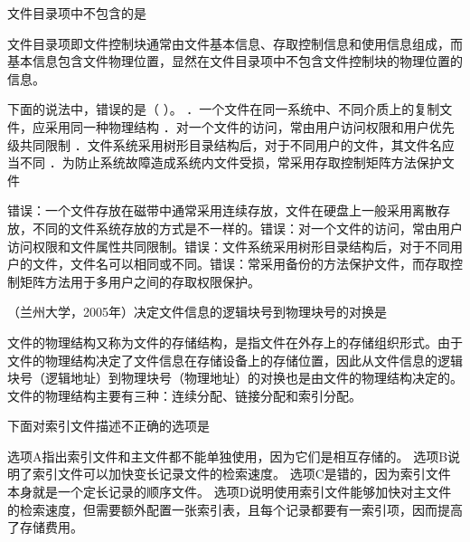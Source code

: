 \question 文件目录项中不包含的是
\par{}
\begin{solution}文件目录项即文件控制块通常由文件基本信息、存取控制信息和使用信息组成，而基本信息包含文件物理位置，显然在文件目录项中不包含文件控制块的物理位置的信息。
\end{solution}
\question 下面的说法中，错误的是（ ）。
．一个文件在同一系统中、不同介质上的复制文件，应采用同一种物理结构
．对一个文件的访问，常由用户访问权限和用户优先级共同限制
．文件系统采用树形目录结构后，对于不同用户的文件，其文件名应当不同
．为防止系统故障造成系统内文件受损，常采用存取控制矩阵方法保护文件
\par{}
\begin{solution}错误：一个文件存放在磁带中通常采用连续存放，文件在硬盘上一般采用离散存放，不同的文件系统存放的方式是不一样的。错误：对一个文件的访问，常由用户访问权限和文件属性共同限制。错误：文件系统采用树形目录结构后，对于不同用户的文件，文件名可以相同或不同。错误：常采用备份的方法保护文件，而存取控制矩阵方法用于多用户之间的存取权限保护。
\end{solution}
\question （兰州大学，2005年）决定文件信息的逻辑块号到物理块号的对换是
\par{}
\begin{solution}文件的物理结构又称为文件的存储结构，是指文件在外存上的存储组织形式。由于文件的物理结构决定了文件信息在存储设备上的存储位置，因此从文件信息的逻辑块号（逻辑地址）到物理块号（物理地址）的对换也是由文件的物理结构决定的。
文件的物理结构主要有三种：连续分配、链接分配和索引分配。
\end{solution}
\question 下面对索引文件描述不正确的选项是
\par{}
\begin{solution}选项A指出索引文件和主文件都不能单独使用，因为它们是相互存储的。
选项B说明了索引文件可以加快变长记录文件的检索速度。
选项C是错的，因为索引文件本身就是一个定长记录的顺序文件。
选项D说明使用索引文件能够加快对主文件的检索速度，但需要额外配置一张索引表，且每个记录都要有一索引项，因而提高了存储费用。
\end{solution}
